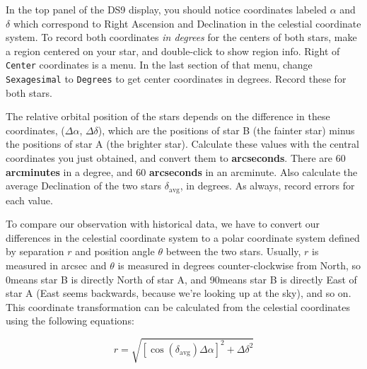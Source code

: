 
In the top panel of the DS9 display, you should notice coordinates labeled $\alpha$ and $\delta$ which correspond to Right Ascension and Declination in the celestial coordinate system. To record both coordinates \textit{in degrees} for the centers of both stars, make a region centered on your star, and double-click to show region info. Right of \texttt{Center} coordinates is a menu. In the last section of that menu, change \texttt{Sexagesimal} to \texttt{Degrees} to get center coordinates in degrees. Record these for both stars.   

The relative orbital position of the stars depends on the difference in these coordinates, ($\Delta\alpha$, $\Delta\delta$), which are the positions of star B (the fainter star) minus the positions of star A (the brighter star). Calculate these values with the central coordinates you just obtained, and convert them to \textbf{arcseconds}. There are 60 \textbf{arcminutes} in a degree, and 60 \textbf{arcseconds} in an arcminute. Also calculate the average Declination of the two stars $\delta_{\textrm{avg}}$, in degrees. As always, record errors for each value.  %

To compare our observation with historical data, we have to convert our differences in the celestial coordinate system to a polar coordinate system defined by separation $r$ and position angle $\theta$ between the two stars. Usually, $r$ is measured in arcsec and $\theta$ is measured in degrees counter-clockwise from North, so $0$\textdegree means star B is directly North of star A, and 90\textdegree means star B is directly East of star A (East seems backwards, because we’re looking up at the sky), and so on. This coordinate transformation can be calculated from the celestial coordinates using the following equations:

\begin{equation}
r = \sqrt{[\cos(\delta_{\textrm{avg}})\Delta\alpha]^2 + \Delta\delta^2}
\end{equation}

